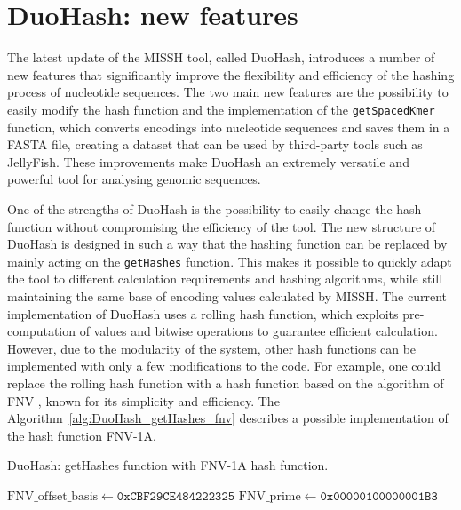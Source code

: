 \section{DuoHash: new features}
\label{sec:DuoHash-newFeatures}

The latest update of the \acs{MISSH} tool, called DuoHash, introduces a number of new features that significantly improve the flexibility and efficiency of the hashing process of nucleotide sequences. The two main new features are the possibility to easily modify the hash function and the implementation of the \verb|getSpacedKmer| function, which converts encodings into nucleotide sequences and saves them in a FASTA file, creating a dataset that can be used by third-party tools such as JellyFish. These improvements make DuoHash an extremely versatile and powerful tool for analysing genomic sequences.

One of the strengths of DuoHash is the possibility to easily change the hash function without compromising the efficiency of the tool. The new structure of DuoHash is designed in such a way that the hashing function can be replaced by mainly acting on the \verb|getHashes| function. This makes it possible to quickly adapt the tool to different calculation requirements and hashing algorithms, while still maintaining the same base of encoding values calculated by \acs{MISSH}. The current implementation of DuoHash uses a rolling hash function, which exploits pre-computation of values and bitwise operations to guarantee efficient calculation. However, due to the modularity of the system, other hash functions can be implemented with only a few modifications to the code. For example, one could replace the rolling hash function with a hash function based on the algorithm of \ac{FNV} \cite{fowler2005fnv}, known for its simplicity and efficiency. The Algorithm~\ref{alg:DuoHash_getHashes_fnv} describes a possible implementation of the hash function \acs{FNV}-1A.

\begin{algorithm}[!ht]
	\caption{DuoHash: getHashes function with \acs{FNV}-1A hash function.}
	\label{alg:DuoHash_getHashes_fnv}
	
	$\mathrm{FNV\_offset\_basis} \gets \texttt{0xCBF29CE484222325}$\;
	$\mathrm{FNV\_prime} \gets \texttt{0x00000100000001B3}$\;

\end{algorithm}

